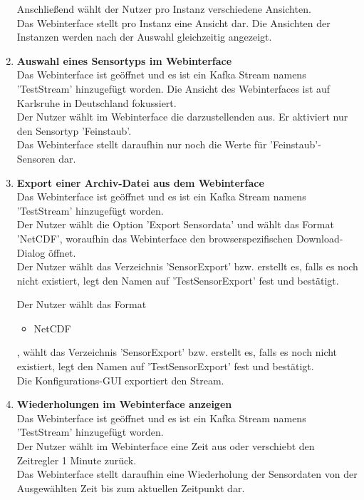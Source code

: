 \begin{enumerate}[label=\textbf{TI\arabic{enumi}0}]
		Anschließend wählt der Nutzer pro Instanz verschiedene Ansichten.\\
		Das Webinterface stellt pro Instanz eine Ansicht dar. Die Ansichten der Instanzen werden nach der Auswahl gleichzeitig angezeigt.
	\item \textbf{Auswahl eines Sensortyps im Webinterface}\\
		Das Webinterface ist geöffnet und es ist ein Kafka Stream namens 'TestStream' hinzugefügt worden. Die Ansicht des Webinterfaces ist auf Karlsruhe in Deutschland fokussiert.\\
		Der Nutzer wählt im Webinterface die darzustellenden  aus. Er aktiviert nur den Sensortyp 'Feinstaub'.\\
		Das Webinterface stellt daraufhin nur noch die Werte für 'Feinstaub'-Sensoren dar.\par
	\item \textbf{Export einer Archiv-Datei aus dem Webinterface}\\
		Das Webinterface ist geöffnet und es ist ein Kafka Stream namens 'TestStream' hinzugefügt worden.\\
		Der Nutzer wählt die Option 'Export Sensordata' und wählt das Format 'NetCDF', woraufhin das Webinterface den browserspezifischen Download-Dialog öffnet.\\
		Der Nutzer wählt das Verzeichnis 'SensorExport' bzw. erstellt es, falls es noch nicht existiert, legt den Namen auf 'TestSensorExport' fest und bestätigt.\par
		
		Der Nutzer wählt das Format
		\begin{itemize}
		\item NetCDF
		\end{itemize}
		, wählt das Verzeichnis 'SensorExport' bzw. erstellt es, falls es noch nicht existiert, legt den Namen auf 'TestSensorExport' fest und bestätigt.\\
		Die Konfigurations-GUI exportiert den Stream.
	\item \textbf{Wiederholungen im Webinterface anzeigen}\\
		Das Webinterface ist geöffnet und es ist ein Kafka Stream namens 'TestStream' hinzugefügt worden.\\
		Der Nutzer wählt im Webinterface eine Zeit aus oder verschiebt den Zeitregler 1 Minute zurück. \\
		Das Webinterface stellt daraufhin eine Wiederholung der Sensordaten von der Ausgewählten Zeit bis zum aktuellen Zeitpunkt dar.\par
		

\end{enumerate}
